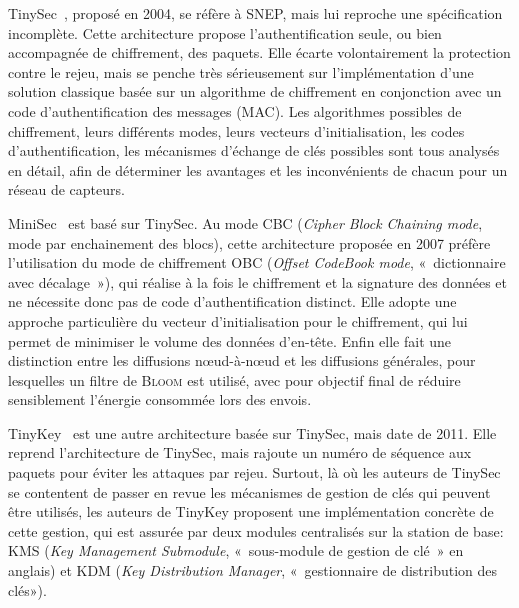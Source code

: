 TinySec~\cite{KSW04}, proposé en 2004, se réfère à SNEP, mais lui reproche une spécification incomplète.
Cette architecture propose l'authentification seule, ou bien accompagnée de chiffrement, des paquets.
Elle écarte volontairement la protection contre le rejeu, mais se penche très sérieusement sur l'implémentation d'une solution classique basée sur un algorithme de chiffrement en conjonction avec un code d'authentification des messages (MAC).
Les algorithmes possibles de chiffrement, leurs différents modes, leurs vecteurs d'initialisation, les codes d'authentification, les mécanismes d'échange de clés possibles sont tous analysés en détail, afin de déterminer les avantages et les inconvénients de chacun pour un réseau de capteurs.

MiniSec~\cite{LMPG07} est basé sur TinySec.
Au mode CBC (\textit{Cipher Block Chaining mode}, mode par enchainement des blocs), cette architecture proposée en 2007 préfère l'utilisation du mode de chiffrement OBC (\textit{Offset CodeBook mode}, « dictionnaire avec décalage »), qui réalise à la fois le chiffrement et la signature des données et ne nécessite donc pas de code d'authentification distinct.
Elle adopte une approche particulière du vecteur d'initialisation pour le chiffrement, qui lui permet de minimiser le volume des données d'en-tête.
Enfin elle fait une distinction entre les diffusions nœud-à-nœud et les diffusions générales, pour lesquelles un filtre de \textsc{Bloom} est utilisé, avec pour objectif final de réduire sensiblement l'énergie consommée lors des envois.

TinyKey~\cite{CRS11} est une autre architecture basée sur TinySec, mais date de 2011.
Elle reprend l'architecture de TinySec, mais rajoute un numéro de séquence aux paquets pour éviter les attaques par rejeu.
Surtout, là où les auteurs de TinySec se contentent de passer en revue les mécanismes de gestion de clés qui peuvent être utilisés, les auteurs de TinyKey proposent une implémentation concrète de cette gestion, qui est assurée par deux modules centralisés sur la station de base: KMS (\textit{Key Management Submodule}, « sous-module de gestion de clé » en anglais) et KDM (\textit{Key Distribution Manager}, « gestionnaire de distribution des clés»).

